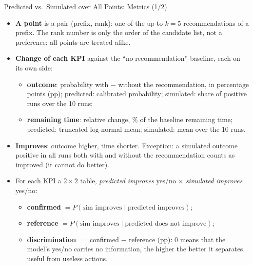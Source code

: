 \documentclass[aspectratio=169]{beamer} %
\begin{document}
\begin{frame}{Predicted vs.\ Simulated over All Points: Metrics (1/2)}
  \footnotesize
  \begin{itemize}
    \item \textbf{A point} is a pair (prefix, rank): one of the up to $k = 5$ recommendations of a prefix.
      The rank number is only the order of the candidate list, not a preference: all points are treated alike.
    \item \textbf{Change of each KPI} against the ``no recommendation'' baseline, each on its own side:
      \begin{itemize}\footnotesize
        \item \textbf{outcome}: probability with $-$ without the recommendation, in percentage points (pp);
          predicted: calibrated probability; simulated: share of positive runs over the 10 runs;
        \item \textbf{remaining time}: relative change, \% of the baseline remaining time; predicted: truncated
          log-normal mean; simulated: mean over the 10 runs.
      \end{itemize}
    \item \textbf{Improves}: outcome higher, time shorter. Exception: a simulated outcome positive in all runs both
      with and without the recommendation counts as improved (it cannot do better).
    \item For each KPI a $2\times2$ table, \emph{predicted improves} yes/no $\times$ \emph{simulated improves} yes/no:
      \begin{itemize}\footnotesize
        \item \textbf{confirmed} $= P(\text{sim improves} \mid \text{predicted improves})$;
        \item \textbf{reference} $= P(\text{sim improves} \mid \text{predicted does not improve})$;
        \item \textbf{discrimination} $=$ confirmed $-$ reference (pp): $0$ means that the model's yes/no carries
          no information, the higher the better it separates useful from useless actions.
      \end{itemize}
  \end{itemize}
\end{frame}
\end{document}
